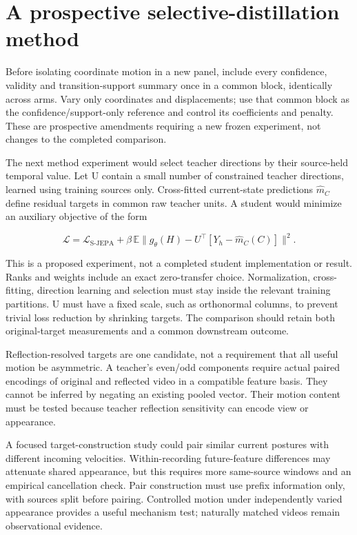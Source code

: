 \documentclass{article}
\begin{document}
\section{A prospective selective-distillation method}\label{a-prospective-selective-distillation-method}

Before isolating coordinate motion in a new panel, include every confidence, validity and transition-support summary once in a common block, identically across arms. Vary only coordinates and displacements; use that common block as the confidence/support-only reference and control its coefficients and penalty. These are prospective amendments requiring a new frozen experiment, not changes to the completed comparison.

The next method experiment would select teacher directions by their source-held temporal value. Let U contain a small number of constrained teacher directions, learned using training sources only. Cross-fitted current-state predictions \(\widehat m_C\) define residual targets in common raw teacher units. A student would minimize an auxiliary objective of the form

\[
\mathcal L=\mathcal L_{\text{S-JEPA}}+
\beta\,\mathbb E\big\|g_\theta(H)-
U^\top[Y_h-\widehat m_C(C)]\big\|^2.
\]

This is a proposed experiment, not a completed student implementation or result. Ranks and weights include an exact zero-transfer choice. Normalization, cross-fitting, direction learning and selection must stay inside the relevant training partitions. U must have a fixed scale, such as orthonormal columns, to prevent trivial loss reduction by shrinking targets. The comparison should retain both original-target measurements and a common downstream outcome.

Reflection-resolved targets are one candidate, not a requirement that all useful motion be asymmetric. A teacher's even/odd components require actual paired encodings of original and reflected video in a compatible feature basis. They cannot be inferred by negating an existing pooled vector. Their motion content must be tested because teacher reflection sensitivity can encode view or appearance.

A focused target-construction study could pair similar current postures with different incoming velocities. Within-recording future-feature differences may attenuate shared appearance, but this requires more same-source windows and an empirical cancellation check. Pair construction must use prefix information only, with sources split before pairing. Controlled motion under independently varied appearance provides a useful mechanism test; naturally matched videos remain observational evidence.
\end{document}
